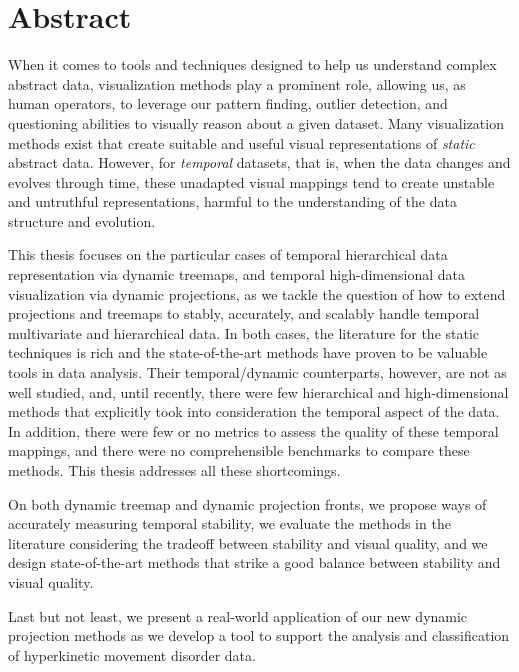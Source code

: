 \begingroup

\let\clearpage\relax
\let\cleardoublepage\relax
\let\cleardoublepage\relax

\manualmark
{} 

\chapter*{Abstract}


When it comes to tools and techniques designed to help us understand complex abstract data, visualization methods play a prominent role, allowing us, as human operators, to leverage our pattern finding, outlier detection, and questioning abilities to visually reason about a given dataset.
Many visualization methods exist that create suitable and useful visual representations of \emph{static} abstract data. However, for \emph{temporal} datasets, that is, when the data changes and evolves through time, these unadapted visual mappings tend to create unstable and untruthful representations, harmful to the understanding of the data structure and evolution.

This thesis focuses on the particular cases of temporal hierarchical data representation via dynamic treemaps, and temporal high-dimensional data visualization via dynamic projections, as we tackle the question of how to extend projections and treemaps to stably, accurately, and scalably handle temporal multivariate and hierarchical data.
In both cases, the literature for the static techniques is rich and the state-of-the-art methods have proven to be valuable tools in data analysis. Their temporal/dynamic counterparts, however, are not as well studied, and, until recently, there were few hierarchical and high-dimensional methods that explicitly took into consideration the temporal aspect of the data. In addition, there were few or no metrics to assess the quality of these temporal mappings, and there were no comprehensible benchmarks to compare these methods. This thesis addresses all these shortcomings.

On both dynamic treemap and dynamic projection fronts, we propose ways of accurately measuring temporal stability, we evaluate the methods in the literature considering the tradeoff between stability and visual quality, and we design state-of-the-art methods that strike a good balance between stability and visual quality.

Last but not least, we present a real-world application of our new dynamic projection methods as we develop a tool to support the analysis and classification of hyperkinetic movement disorder data.

